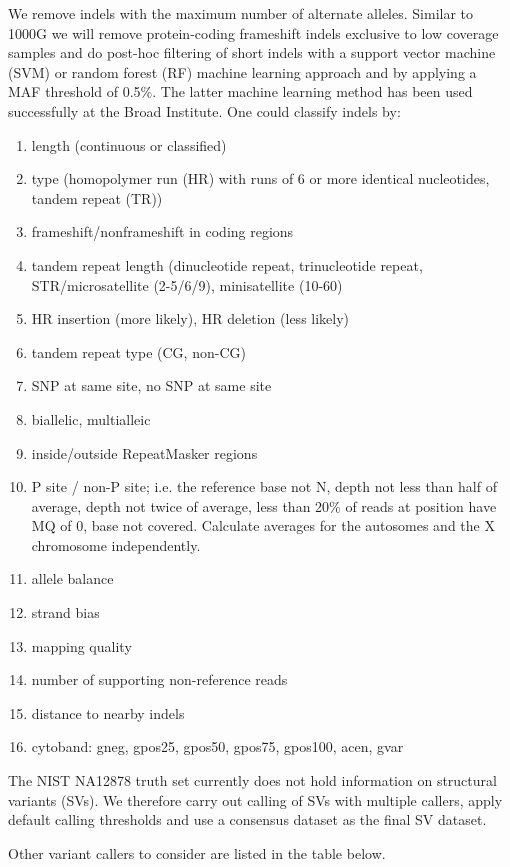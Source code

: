 We remove indels with the maximum number of alternate alleles.
Similar to 1000G we will remove protein-coding frameshift indels exclusive to low coverage samples and do post-hoc filtering of short indels with a support vector machine (SVM) or random forest (RF) machine learning approach and by applying a MAF threshold of 0.5\%. The latter machine learning method has been used successfully at the Broad Institute. One could classify indels by:
\begin{enumerate}
\item length (continuous or classified)
\item type (homopolymer run (HR) with runs of 6 or more identical nucleotides, tandem repeat (TR))
\item frameshift/nonframeshift in coding regions
\item tandem repeat length (dinucleotide repeat, trinucleotide repeat, STR/microsatellite (2-5/6/9), minisatellite (10-60)
\item HR insertion (more likely), HR deletion (less likely)
\item tandem repeat type (CG, non-CG)
\item SNP at same site, no SNP at same site
\item biallelic, multialleic
\item inside/outside RepeatMasker regions
\item P site / non-P site; i.e. the reference base not N, depth not less than half of average, depth not twice of average, less than 20\% of reads at position have MQ of 0, base not covered. Calculate averages for the autosomes and the X chromosome independently.
\item allele balance
\item strand bias
\item mapping quality
\item number of supporting non-reference reads
\item distance to nearby indels
\item cytoband: gneg, gpos25, gpos50, gpos75, gpos100, acen, gvar
\end{enumerate}

The NIST NA12878 truth set currently does not hold information on structural variants (SVs). We therefore carry out calling of SVs with multiple callers, apply default calling thresholds and use a consensus dataset as the final SV dataset.

Other variant callers to consider are listed in the table below.
